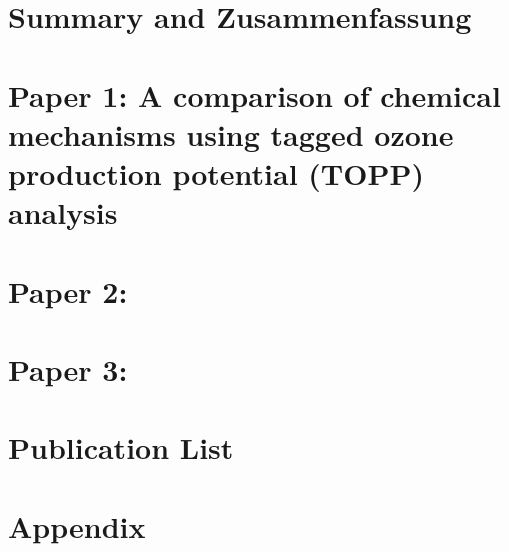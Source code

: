 \documentclass[12pt,twoside,openright,a4paper]{report}
\begin{document}
\chapter{Summary and Zusammenfassung} \label{s:summary}
\clearpage{\pagestyle{empty}\cleardoublepage}


 
\clearpage{\pagestyle{empty}\cleardoublepage}

\chapter{Paper 1: A comparison of chemical mechanisms using tagged ozone production potential (TOPP) analysis}
\clearpage{\pagestyle{empty}\cleardoublepage}


\chapter{Paper 2: }
\clearpage{\pagestyle{empty}\cleardoublepage}

\chapter{Paper 3: }
\clearpage{\pagestyle{empty}\cleardoublepage}

\chapter{Publication List}
\clearpage{\pagestyle{empty}\cleardoublepage}

\chapter*{Appendix}
\clearpage{\pagestyle{empty}\cleardoublepage}
\end{document}
